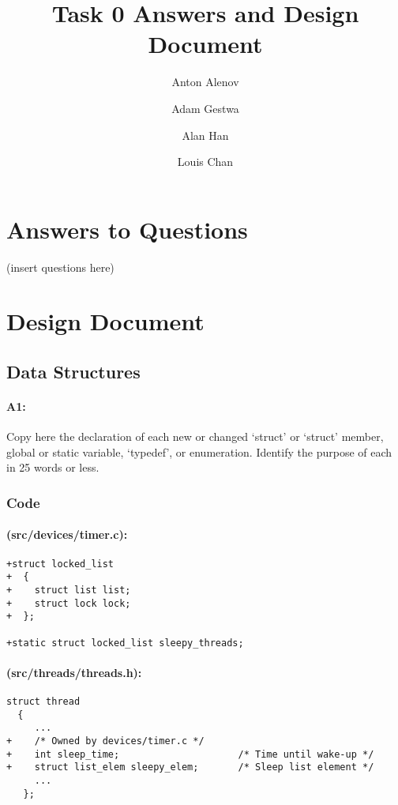 \documentclass[11pt]{article}
\begin{document}
\title{Task 0 Answers and Design Document}
\author{Anton Alenov \and Adam Gestwa \and Alan Han \and Louis Chan}

\maketitle

\section{Answers to Questions}
(insert questions here)

\section{Design Document}
\subsection{Data Structures}
\paragraph{A1:} Copy here the declaration of each new or changed ‘struct’ or ‘struct’ member, global or static variable, ‘typedef’, or enumeration. Identify the purpose of each in 25 words or less.
\subsubsection{Code}

\paragraph{(src/devices/timer.c):}

\begin{verbatim}
+struct locked_list
+  {
+    struct list list;
+    struct lock lock;
+  };

+static struct locked_list sleepy_threads;
\end{verbatim}

\paragraph{(src/threads/threads.h):}

\begin{verbatim}
struct thread
  {
     ...
+    /* Owned by devices/timer.c */
+    int sleep_time;                     /* Time until wake-up */
+    struct list_elem sleepy_elem;       /* Sleep list element */
     ...
   };

\end{verbatim}
\end{document}

